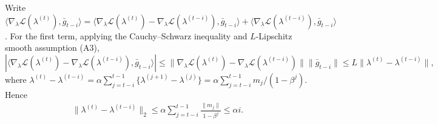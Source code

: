 \documentclass{statsoc}
\newcommand\mL{{\mathcal{L}}}
\begin{document}
Write $\langle \nabla_\lambda \mL(\lambda^{(t)}), \bar{g}_{t-i} \rangle =  \langle \nabla_\lambda \mL(\lambda^{(t)}) - \nabla_\lambda \mL(\lambda^{(t-i)}), \bar{g}_{t-i} \rangle  +  \langle \nabla_\lambda \mL(\lambda^{(t-i)}), \bar{g}_{t-i} \rangle$. For the first term, applying the Cauchy–Schwarz inequality and $L$-Lipschitz smooth assumption (A3),
\[
|\langle \nabla_\lambda \mL(\lambda^{(t)}) - \nabla_\lambda \mL(\lambda^{(t-i)}), \bar{g}_{t-i} \rangle| \leq \|\nabla_\lambda \mL(\lambda^{(t)}) - \nabla_\lambda \mL(\lambda^{(t-i)}) \| \|\bar{g}_{t-i}\| \leq L \|\lambda^{(t)} - \lambda^{(t-i)} \|,
\]
where $\lambda^{(t)} - \lambda^{(t-i)} = \alpha \sum_{j=t-i}^{t-1} \{\lambda^{(j+1)} - \lambda^{(j)}\} = \alpha \sum_{j=t-i}^{t-1} m_j/(1-\beta^j)$. Hence
\begin{align*}
\|\lambda^{(t)} - \lambda^{(t-i)} \|_2  \leq \alpha \sum_{j=t-i}^{t-1} \frac{\| m_j \|}{1-\beta^j} \leq \alpha i.
\end{align*}
\end{document}
